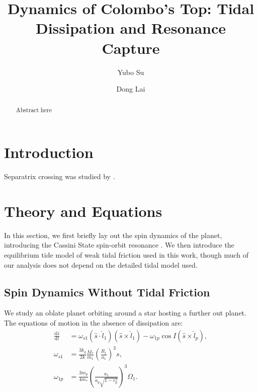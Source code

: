 \documentclass[twocolumn]{aastex63}
\newcommand*{\rd}[2]{\frac{\mathrm{d}#1}{\mathrm{d}#2}}
\newcommand*{\p}[1]{\left(#1\right)}
\begin{document}
\title{Dynamics of Colombo's Top: Tidal Dissipation and Resonance Capture}


\author[0000-0001-8283-3425]{Yubo Su}%

\author[0000-0002-1934-6250]{Dong Lai}%

\begin{abstract}
    Abstract here
\end{abstract}


\section{Introduction}

Separatrix crossing was studied by \citep{henrard1982}.

\section{Theory and Equations}\label{s:theory}

In this section, we first briefly lay out the spin dynamics of the planet,
introducing the Cassini State spin-orbit resonance \citep[for more details,
see][]{su2020}. We then introduce the equilibrium tide model of weak tidal
friction used in this work, though much of our analysis does not depend on the
detailed tidal model used.

\subsection{Spin Dynamics Without Tidal Friction}\label{ss:theory_spin}

We study an oblate planet orbiting around a star hosting a further out planet.
The equations of motion in the absence of dissipation are:
\begin{align}
    \rd{\hat{s}}{t}
        &= \omega_{s1}\p{\hat{s} \cdot \hat{l}_1}\p{\hat{s} \times \hat{l}_1}
            - \omega_{1p}\cos I\p{\hat{s} \times \hat{l}_p},\\
    \omega_{s1} &= \frac{3k_q}{2k}\frac{M_*}{m_1}\p{\frac{R_1}{a_1}}^3 s,\\
    \omega_{1p} &= \frac{3m_p}{4m_*}\p{\frac{a_1}{a_p\sqrt{1 - e_p^2}}}^3 \Omega_1.
\end{align}
\end{document}
